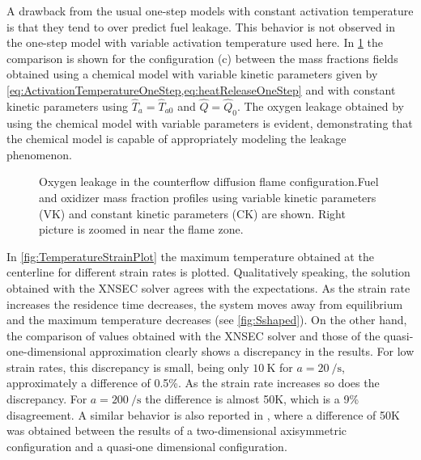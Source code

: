 A drawback from the usual one-step models with constant activation temperature is that they tend to over predict fuel leakage. This behavior is not observed in the one-step model with variable activation temperature used here.  In \cref{fig:VarParams} the comparison is shown for the configuration (c) between the mass fractions fields obtained using a chemical model with variable kinetic parameters given by \cref{eq:ActivationTemperatureOneStep,eq:heatReleaseOneStep} and with constant kinetic parameters using $\hat T_a = \hat T_{a0}$ and  $\hat Q = \hat Q_{0}$.  The oxygen leakage obtained by using the chemical model with variable parameters is evident, demonstrating that the chemical model is capable of appropriately modeling the leakage phenomenon. 
 
 
 \begin{figure}[h]
 	\centering
 	\caption[Fuel and oxidizer mass fraction profiles using constant kinetic parameters and variable kinetic parameters]{Oxygen leakage in the counterflow diffusion flame configuration.Fuel and oxidizer mass fraction profiles  using variable kinetic parameters (VK) and constant kinetic parameters (CK) are shown. Right picture is zoomed in near the flame zone.} \label{fig:VarParams}
 \end{figure}

 
In \cref{fig:TemperatureStrainPlot} the maximum temperature obtained at the centerline for different strain rates is plotted. Qualitatively speaking, the solution obtained with the XNSEC solver agrees with the expectations. As the strain rate increases the residence time decreases, the system moves away from equilibrium and the maximum temperature decreases (see \cref{fig:Sshaped}). On the other hand, the comparison of values obtained with the XNSEC solver and those of the quasi-one-dimensional approximation clearly shows a discrepancy in the results. For low strain rates, this discrepancy is small, being only $\SI{10}{\kelvin}$ for  $a = \SI{20}{\per\second}$, approximately a difference of 0.5\%. As the strain rate increases so does the discrepancy. For $a = \SI{200}{\per\second}$ the difference is almost 50K, which is a 9\% disagreement. A similar behavior is also reported in \textcite{frouzakisTwodimensionalDirectNumerical1998}, where a difference of 50K was obtained between the results of a two-dimensional  axisymmetric configuration and a quasi-one dimensional configuration. 

